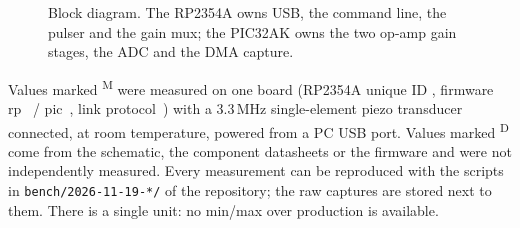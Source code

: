\documentclass[10pt,a4paper]{article}
\newcommand{\meas}{\textsuperscript{M}}
\newcommand{\des}{\textsuperscript{D}}
\begin{document}
\begin{figure}[H]
\caption{Block diagram. The RP2354A owns USB, the command line, the pulser and the gain mux; the PIC32AK owns the two op-amp gain stages, the ADC and the DMA capture.}
\end{figure}

\newpage
\tableofcontents
\vspace{6pt}
\begin{tcolorbox}[colback=accentlight,colframe=accent,arc=1mm,boxrule=0.5pt,title={\bfseries How to read this datasheet},fonttitle=\small]
\small Values marked \meas{} were measured on one board (RP2354A unique ID \vuid, firmware rp~\vrpfw{} / pic~\vpicfw{}, link protocol~\vproto)
with a 3.3\,MHz single-element piezo transducer connected, at room temperature, powered from a PC USB port. Values marked \des{} come
from the schematic, the component datasheets or the firmware and were not independently measured. Every measurement can be
reproduced with the scripts in \texttt{bench/2026-11-19-*/} of the repository; the raw captures are stored next to them.
There is a single unit: no min/max over production is available.
\end{tcolorbox}

\end{document}
